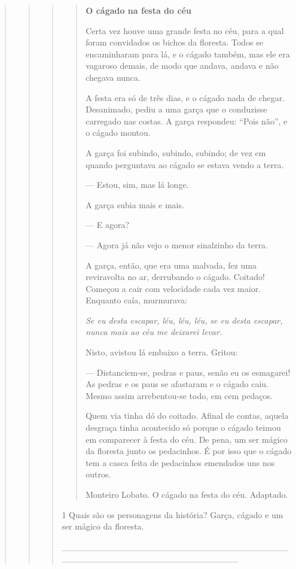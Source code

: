 \begin{boxlist}
{{\begin{quote}
\begin{quote}
\begin{quote}
{\begin{quote}
\textbf{O cágado na festa do céu}

Certa vez houve uma grande festa no céu, para a qual foram convidados os
bichos da floresta. Todos se encaminharam para lá, e o cágado também, mas
ele era vagaroso demais, de modo que andava, andava e não chegava
nunca.

A festa era só de três dias, e o cágado nada de chegar. Desanimado, pediu
a uma garça que o conduzisse carregado nas costas. A garça respondeu: ``Pois não'', e
o cágado montou.

A garça foi subindo, subindo, subindo; de vez em quando perguntava ao
cágado se estava vendo a terra.

--- Estou, sim, mas lá longe.

A garça subia mais e mais.

--- E agora?

--- Agora já não vejo o menor sinalzinho da terra.

A garça, então, que era uma malvada, fez uma reviravolta no ar,
derrubando o cágado. Coitado! Começou a cair com velocidade cada vez
maior. Enquanto caía, murmurava:

\emph{Se eu desta escapar,}
\emph{léu, léu, léu,}
\emph{se eu desta escapar,}
\emph{nunca mais ao céu me deixarei levar.}

Nisto, avistou lá embaixo a terra. Gritou:

--- Distanciem-se, pedras e paus, senão eu os esmagarei! As pedras e os paus
se afastaram e o cágado caiu. Mesmo assim arrebentou-se todo, em cem
pedaços.

Quem via tinha dó do coitado. Afinal de contas, aquela
desgraça tinha acontecido só porque o cágado teimou em comparecer à festa do
céu. De pena, um ser mágico da floresta junto os pedacinhos.
É por isso que o cágado tem a casca feita de pedacinhos emendados uns
nos outros.

\fonte Monteiro Lobato. O cágado na festa do céu. Adaptado.
\end{quote}


\num{1} Quais são os personagens da história? Garça, cágado e um ser mágico da floresta.

\_\_\_\_\_\_\_\_\_\_\_\_\_\_\_\_\_\_\_\_\_\_\_\_\_\_\_\_\_\_\_\_\_\_\_\_\_\_\_\_\_\_\_\_\_\_\_\_\_\_\_\_\_\_\_\_\_\_\_\_\_\_\_\_

}
\end{quote}
\end{quote}
\end{quote}}}
\end{boxlist}
